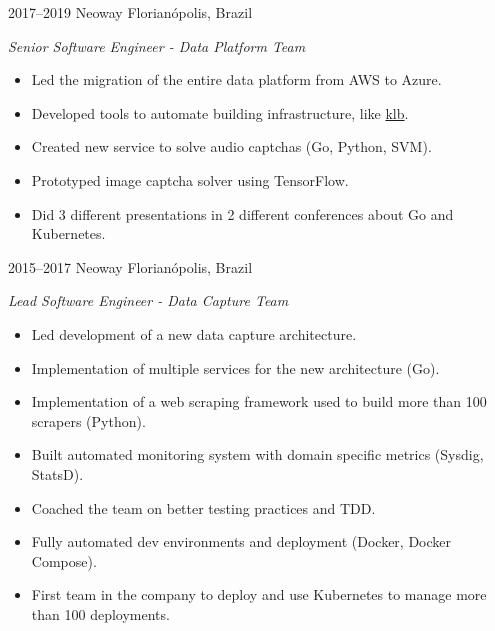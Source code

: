 \documentclass[]{friggeri-cv} %
\begin{document}
\begin{entrylist}
\entry
{2017--2019}
{Neoway}
{Florianópolis, Brazil}
{\emph{Senior Software Engineer - Data Platform Team} \\

\begin{itemize}
  \item Led the migration of the entire data platform from AWS to Azure.
  \item Developed tools to automate building infrastructure, like {\href{https://github.com/NeowayLabs/klb}{klb}}.
  \item Created new service to solve audio captchas (Go, Python, SVM).
  \item Prototyped image captcha solver using TensorFlow.
  \item Did 3 different presentations in 2 different conferences about Go and Kubernetes.
\end{itemize}
}
\end{entrylist}

\begin{entrylist}
\entry
{2015--2017}
{Neoway}
{Florianópolis, Brazil}
{\emph{Lead Software Engineer - Data Capture Team} \\

\begin{itemize}
  \item Led development of a new data capture architecture.
  \item Implementation of multiple services for the new architecture (Go).
  \item Implementation of a web scraping framework used to build more than 100 scrapers (Python).
  \item Built automated monitoring system with domain specific metrics (Sysdig, StatsD).
  \item Coached the team on better testing practices and TDD.
  \item Fully automated dev environments and deployment (Docker, Docker Compose).
  \item First team in the company to deploy and use Kubernetes to manage more than 100 deployments.
\end{itemize}
}
\end{entrylist}
\end{document}

